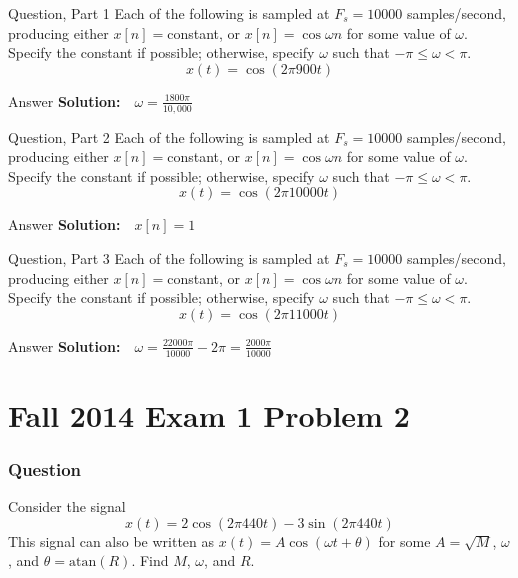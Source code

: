 \documentclass{beamer}
\begin{document}
\begin{frame}
  \begin{block}{Question, Part 1}
  Each of the following is sampled at $F_s=10000$ samples/second,
  producing either $x[n]=$constant, or $x[n]=\cos\omega n$ for some
  value of $\omega$.  Specify the constant if possible; otherwise,
  specify $\omega$ such that $-\pi\le\omega <\pi$.
  \[x(t)=\cos\left(2\pi 900t\right)\]
  \end{block}
  \begin{block}{Answer}
    {\bf Solution:}~~$ \omega = \frac{1800\pi}{10,000}$
  \end{block}
\end{frame}


\begin{frame}
  \begin{block}{Question, Part 2}
  Each of the following is sampled at $F_s=10000$ samples/second,
  producing either $x[n]=$constant, or $x[n]=\cos\omega n$ for some
  value of $\omega$.  Specify the constant if possible; otherwise,
  specify $\omega$ such that $-\pi\le\omega <\pi$.
  \[x(t)=\cos\left(2\pi 10000t\right)\]
  \end{block}
  \begin{block}{Answer}
    {\bf Solution:}~~$ x[n]=1$
  \end{block}
\end{frame}
\begin{frame}
  \begin{block}{Question, Part 3}
  Each of the following is sampled at $F_s=10000$ samples/second,
  producing either $x[n]=$constant, or $x[n]=\cos\omega n$ for some
  value of $\omega$.  Specify the constant if possible; otherwise,
  specify $\omega$ such that $-\pi\le\omega <\pi$.
  \[x(t)=\cos\left(2\pi 11000t\right)\]
  \end{block}
  \begin{block}{Answer}
    {\bf Solution:}~~$ \omega = \frac{22000\pi}{10000}-2\pi =\frac{2000\pi}{10000}$
  \end{block}
\end{frame}

\section[14x1p2]{Fall 2014 Exam 1 Problem 2}
\setcounter{subsection}{1}

\begin{frame}
  \frametitle{Question}
  Consider the signal 
  \[
  x(t) = 2\cos\left(2\pi 440t\right)-3\sin\left(2\pi 440t\right)
  \]
  This signal can also be written as $x(t)=A\cos\left(\omega
  t+\theta\right)$ for some $A=\sqrt{M}$, $\omega$, and
  $\theta=\mbox{atan}(R)$.  Find $M$, $\omega$, and $R$.
\end{frame}
\end{document}
